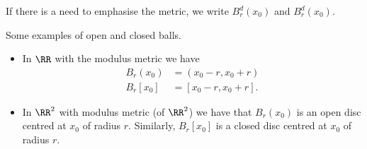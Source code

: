 \documentclass[12pt, a4paper]{article}
\begin{document}
\begin{mdremark}
    If there is a need to emphasise the metric, we write \(B^d_r(x_0)\) and \(B^d_r(x_0)\).
\end{mdremark}

\begin{example}
    Some examples of open and closed balls.
    \begin{itemize}
        \item In \(\RR\) with the modulus metric we have 
        \[\begin{aligned}
            B_r(x_0) &= (x_0 - r,x_0+r) \\
            B_r[x_0] &= [x_0-r,x_0+r].
        \end{aligned}\]
        \item In \(\RR^2\) with modulus metric (of \(\RR^2\)) we have that \(B_r(x_0)\) is an open disc centred at \(x_0\) of radius \(r\). Similarly, \(B_r[x_0]\) is a closed disc centred at \(x_0\) of radius \(r\).
    \end{itemize}
\end{example}
\end{document}

